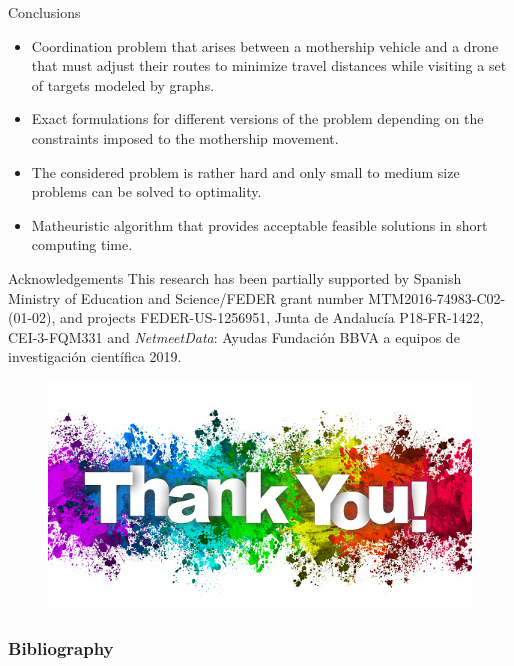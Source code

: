 \documentclass[slidestop,usepdftitle=false,10pt]{beamer}
\begin{document}
	\begin{frame}{Conclusions}
		\begin{itemize}
			\item Coordination problem that arises between a mothership vehicle and a drone that must adjust their routes to minimize travel distances while visiting a set of targets modeled by graphs.
			\item Exact formulations for different versions of the problem depending on the constraints imposed to the mothership movement.
			\item The considered problem is rather hard and only small to medium size problems can be  solved to optimality.
			\item Matheuristic algorithm that provides acceptable feasible solutions in short computing time.
		\end{itemize}
	
	\end{frame}

    \begin{frame}{Acknowledgements}
        This research has been partially supported by Spanish Ministry of Education and Science/FEDER grant number  MTM2016-74983-C02-(01-02), and projects FEDER-US-1256951, Junta de Andaluc\'ia P18-FR-1422, CEI-3-FQM331 and  \textit{NetmeetData}: Ayudas Fundaci\'on BBVA a equipos de investigaci\'on cient\'ifica 2019.
    \end{frame}
    
	\begin{frame}
	    \bigskip
	    \begin{figure}
	        \centering
	        \includegraphics[width=0.7\linewidth]{thank.jpg}
	    \end{figure}
	\end{frame}
	
	
	\begin{frame}[allowframebreaks]
		\frametitle{Bibliography}
		\nocite{*}

		
		
	\end{frame}
	
	
	
	
	
	
	
	
	
	
	
	
	
	
	
	
	
	
	
\end{document}
